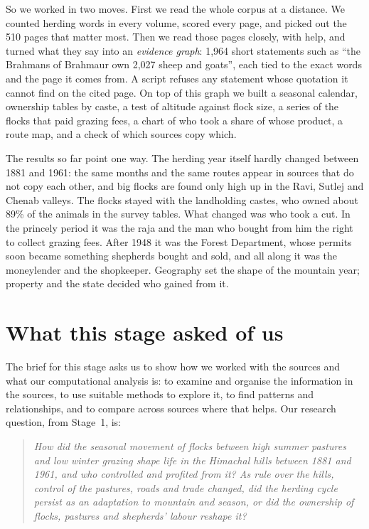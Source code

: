 \documentclass[10pt,a4paper,twocolumn]{article}
\begin{document}
So we worked in two moves. First we read the whole corpus at a distance. We counted herding words in every volume, scored every page, and picked out the 510 pages that matter most. Then we read those pages closely, with help, and turned what they say into an \emph{evidence graph}: 1,964 short statements such as ``the Brahmans of Brahmaur own 2,027 sheep and goats'', each tied to the exact words and the page it comes from. A script refuses any statement whose quotation it cannot find on the cited page. On top of this graph we built a seasonal calendar, ownership tables by caste, a test of altitude against flock size, a series of the flocks that paid grazing fees, a chart of who took a share of whose product, a route map, and a check of which sources copy which.

The results so far point one way. The herding year itself hardly changed between 1881 and 1961: the same months and the same routes appear in sources that do not copy each other, and big flocks are found only high up in the Ravi, Sutlej and Chenab valleys. The flocks stayed with the landholding castes, who owned about 89\% of the animals in the survey tables. What changed was who took a cut. In the princely period it was the raja and the man who bought from him the right to collect grazing fees. After 1948 it was the Forest Department, whose permits soon became something shepherds bought and sold, and all along it was the moneylender and the shopkeeper. Geography set the shape of the mountain year; property and the state decided who gained from it.

\vspace{4pt}
{\hypersetup{linkcolor=ink}\setcounter{tocdepth}{1}\tableofcontents}

\twocolumn
\section{What this stage asked of us}

The brief for this stage asks us to show how we worked with the sources and what our computational analysis is: to examine and organise the information in the sources, to use suitable methods to explore it, to find patterns and relationships, and to compare across sources where that helps. Our research question, from Stage~1, is:

\begin{quote}\itshape How did the seasonal movement of flocks between high summer pastures and low winter grazing shape life in the Himachal hills between 1881 and 1961, and who controlled and profited from it? As rule over the hills, control of the pastures, roads and trade changed, did the herding cycle persist as an adaptation to mountain and season, or did the ownership of flocks, pastures and shepherds' labour reshape it?\end{quote}
\end{document}
